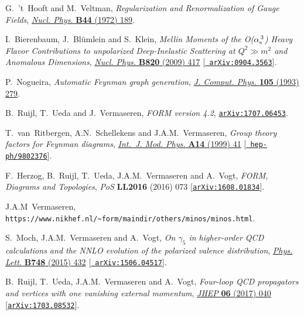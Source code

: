 \documentclass[12pt]{article}
\def\as(#1){{\alpha_{\rm s}^{\,#1}}}
\begin{document}
{\begin{thebibliography}{100}
G.~'t~Hooft and M.~Veltman, \emph{{Regularization and Renormalization of Gauge
  Fields}}, \href{https://dx.doi.org/10.1016/0550-3213(72)90279-9}{\emph{Nucl.
  Phys.} {\bf B44} (1972) 189}.

I.~Bierenbaum, J.~Bl{\"u}mlein and S.~Klein, \emph{{Mellin Moments of the
  O($\as(3)$) Heavy Flavor Contributions to unpolarized Deep-Inelastic
  Scattering at $Q^2 \gg m^2$ and Anomalous Dimensions}},
  \href{https://dx.doi.org/10.1016/j.nuclphysb.2009.06.005}{\emph{Nucl. Phys.}
  {\bf B820} (2009) 417} [\href{https://arxiv.org/abs/0904.3563}{{\tt
  arXiv:0904.3563}}].

P.~Nogueira, \emph{{Automatic Feynman graph generation}},
  \href{https://dx.doi.org/10.1006/jcph.1993.1074}{\emph{J. Comput. Phys.} {\bf
  105} (1993) 279}.

B.~Ruijl, T.~Ueda and J.~Vermaseren, \emph{{FORM version 4.2}},
  \href{https://arxiv.org/abs/1707.06453}{{\tt arXiv:1707.06453}}.

T.~van~Ritbergen, A.N.~Schellekens and J.A.M.~Vermaseren, \emph{{Group theory
  factors for Feynman diagrams}},
  \href{https://dx.doi.org/10.1142/S0217751X99000038}{\emph{Int.~J. Mod. Phys.}
  {\bf A14} (1999) 41} [\href{https://arxiv.org/abs/hep-ph/9802376}{{\tt
  hep-ph/9802376}}].

F.~Herzog, B.~Ruijl, T.~Ueda, J.A.M.~Vermaseren and A.~Vogt, \emph{{FORM,
  Diagrams and Topologies}}, {\emph{PoS} {\bf LL2016} (2016) 073}
  [\href{https://arxiv.org/abs/1608.01834}{{\tt arXiv:1608.01834}}].

J.A.M~Vermaseren, {\tt
https://www.nikhef.nl/\textasciitilde{}form/maindir/others/minos/minos.html}.

S.~Moch, J.A.M.~Vermaseren and A.~Vogt, \emph{{On $\gamma_5^{}$ in higher-order
  QCD calculations and the NNLO evolution of the polarized valence
  distribution}},
  \href{https://dx.doi.org/10.1016/j.physletb.2015.07.027}{\emph{Phys. Lett.}
  {\bf B748} (2015) 432} [\href{https://arxiv.org/abs/1506.04517}{{\tt
  arXiv:1506.04517}}].

B.~Ruijl, T.~Ueda, J.A.M.~Vermaseren and A.~Vogt, \emph{{Four-loop QCD
  propagators and vertices with one vanishing external momentum}},
  \href{https://dx.doi.org/10.1007/JHEP06(2017)040}{\emph{JHEP} {\bf 06} (2017)
  040} [\href{https://arxiv.org/abs/1703.08532}{{\tt arXiv:1703.08532}}].


\end{thebibliography}}
\end{document}

